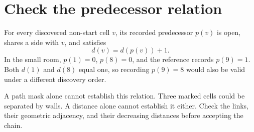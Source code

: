 \section{Check the predecessor relation}\label{maze-x-proof}
For every discovered non-start cell \(v\), its recorded predecessor \(p(v)\) is open,
shares a side with \(v\), and satisfies
\[
  d(v)=d(p(v))+1.
\]
In the small room, \(p(1)=0\), \(p(8)=0\), and the reference records \(p(9)=1\).
Both \(d(1)\) and \(d(8)\) equal one, so recording \(p(9)=8\) would also be valid
under a different discovery order.

A path mask alone cannot establish this relation. Three marked cells could be
separated by walls. A distance alone cannot establish it either. Check the links,
their geometric adjacency, and their decreasing distances before accepting the chain.
